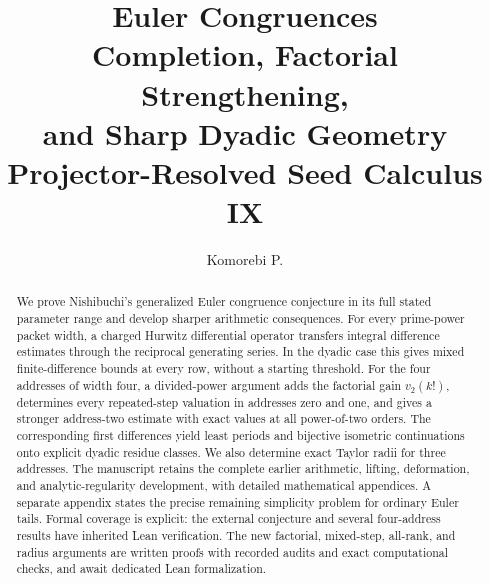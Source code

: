 \documentclass[11pt]{article}
\title{\textbf{Euler Congruences}\\[5pt]
  \Large Completion, Factorial Strengthening,\\ and Sharp Dyadic Geometry\\[7pt]
  \large Projector-Resolved Seed Calculus IX}
\author{Komorebi P.}
\date{}
\theoremstyle{definition}
\theoremstyle{remark}
\numberwithin{equation}{section}
\begin{document}
\KomorebiCover

\relax
\begin{abstract}
We prove Nishibuchi's generalized Euler congruence conjecture in its full stated parameter range and develop sharper arithmetic consequences. For every prime-power packet width, a charged Hurwitz differential operator transfers integral difference estimates through the reciprocal generating series. In the dyadic case this gives mixed finite-difference bounds at every row, without a starting threshold. For the four addresses of width four, a divided-power argument adds the factorial gain $v_2(k!)$, determines every repeated-step valuation in addresses zero and one, and gives a stronger address-two estimate with exact values at all power-of-two orders. The corresponding first differences yield least periods and bijective isometric continuations onto explicit dyadic residue classes. We also determine exact Taylor radii for three addresses. The manuscript retains the complete earlier arithmetic, lifting, deformation, and analytic-regularity development, with detailed mathematical appendices. A separate appendix states the precise remaining simplicity problem for ordinary Euler tails. Formal coverage is explicit: the external conjecture and several four-address results have inherited Lean verification. The new factorial, mixed-step, all-rank, and radius arguments are written proofs with recorded audits and exact computational checks, and await dedicated Lean formalization.
\end{abstract}




\clearpage
{\small\setlength{\parskip}{0pt}\tableofcontents}
\clearpage


\clearpage

\clearpage




\end{document}
